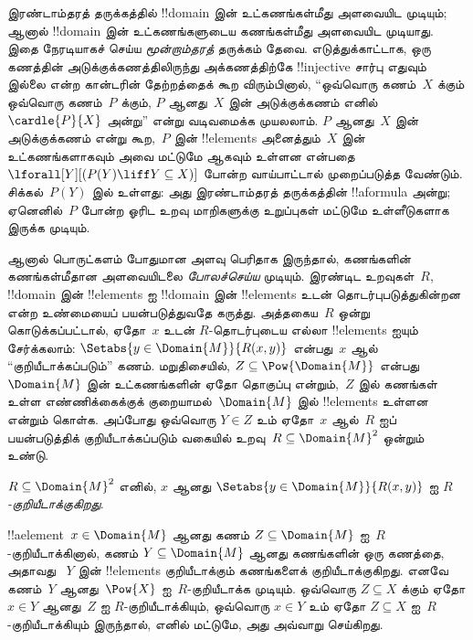 \documentclass[../../../include/open-logic-section]{subfiles}
\begin{document}



\begin{explain}
இரண்டாம்தரத் தருக்கத்தில் !!{domain} இன் உட்கணங்கள்மீது அளவையிட
முடியும்; ஆனால் !!{domain} இன் உட்கணங்களுடைய கணங்கள்மீது அளவையிட
முடியாது. இதை நேரடியாகச் செய்ய \emph{மூன்றாம்தரத்} தருக்கம் தேவை.
எடுத்துக்காட்டாக, ஒரு கணத்தின் அடுக்குக்கணத்திலிருந்து அக்கணத்திற்கே
!!{injective} சார்பு எதுவும் இல்லை என்ற கான்டரின் தேற்றத்தைக் கூற
விரும்பினால், “ஒவ்வொரு கணம்~$X$ க்கும் ஒவ்வொரு கணம்~$P$ க்கும்,
$P$ ஆனது~$X$ இன் அடுக்குக்கணம் எனில்
$\cardle{P}{X}$ அன்று” என்று வடிவமைக்க முயலலாம். $P$ ஆனது~$X$ இன்
அடுக்குக்கணம் என்று கூற,~$P$ இன் !!{element}s அனைத்தும்~$X$ இன்
உட்கணங்களாகவும் அவை மட்டுமே ஆகவும் உள்ளன என்பதை
$\lforall[Y][(P(Y) \liff Y \subseteq X)]$ போன்ற வாய்பாட்டால்
முறைப்படுத்த வேண்டும். சிக்கல்~$P(Y)$ இல் உள்ளது: அது இரண்டாம்தரத்
தருக்கத்தின் !!a{formula} அன்று; ஏனெனில்~$P$ போன்ற ஓரிட உறவு
மாறிகளுக்கு உறுப்புகள் மட்டுமே உள்ளீடுகளாக இருக்க முடியும்.

ஆனால் பொருட்களம் போதுமான அளவு பெரிதாக இருந்தால், கணங்களின்
கணங்கள்மீதான அளவையிடலை \emph{போலச்செய்ய} முடியும். இரண்டிட
உறவுகள்~$R$, !!{domain} இன் !!{element}s ஐ !!{domain} இன்
!!{element}s உடன் தொடர்புபடுத்துகின்றன என்ற உண்மையைப் பயன்படுத்துவதே
கருத்து. அத்தகைய~$R$ ஒன்று கொடுக்கப்பட்டால், ஏதோ~$x$ உடன்
$R$-தொடர்புடைய எல்லா !!{element}s ஐயும் சேர்க்கலாம்:
$\Setabs{y \in
  \Domain{M}}{R(x,y)}$ என்பது~$x$ ஆல் “குறியீடாக்கப்படும்” கணம்.
மறுதிசையில், $Z \subseteq \Pow{\Domain{M}}$ என்பது
~$\Domain{M}$ இன் உட்கணங்களின் ஏதோ தொகுப்பு என்றும்,~$Z$ இல்
கணங்கள் உள்ள எண்ணிக்கைக்குக் குறையாமல்~$\Domain{M}$ இல்
!!{element}s உள்ளன என்றும் கொள்க. அப்போது ஒவ்வொரு $Y \in Z$ உம்
ஏதோ~$x$ ஆல்~$R$ ஐப் பயன்படுத்திக் குறியீடாக்கப்படும் வகையில்
உறவு~$R \subseteq \Domain{M}^2$ ஒன்றும் உண்டு.
\end{explain}

\begin{defn}
$R \subseteq \Domain{M}^2$ எனில், $x$ ஆனது
$\Setabs{y \in \Domain{M}}{R(x, y)}$ ஐ
\emph{$R$-குறியீடாக்குகிறது}.
\end{defn}

!!a{element}~$x \in \Domain{M}$ ஆனது கணம்
$Z \subseteq \Domain{M}$ ஐ~$R$-குறியீடாக்கினால், கணம்
$Y \subseteq \Domain{M}$ ஆனது கணங்களின் ஒரு கணத்தை, அதாவது
~$Y$ இன் !!{element}s குறியீடாக்கும் கணங்களைக் குறியீடாக்குகிறது.
எனவே கணம்~$Y$ ஆனது~$\Pow{X}$ ஐ~$R$-குறியீடாக்க முடியும்.
ஒவ்வொரு $Z \subseteq X$ க்கும் ஏதோ $x \in Y$ ஆனது~$Z$ ஐ
$R$-குறியீடாக்கியும், ஒவ்வொரு $x \in Y$ உம் ஏதோ
$Z \subseteq X$ ஐ~$R$-குறியீடாக்கியும் இருந்தால், எனில் மட்டுமே,
அது அவ்வாறு செய்கிறது.
\end{document}
